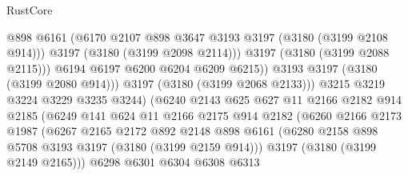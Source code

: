 \begin{lexlean}{RustCore}
\begin{coremodule}
                                      @898
                                      @6161
                                      (@6170
                                        @2107
                                        @898
                                        @3647
                                        @3193
                                        @3197
                                        (@3180 (@3199 @2108 @914)))
                                      @3197
                                      (@3180 (@3199 @2098 @2114)))
                                    @3197
                                    (@3180 (@3199 @2088 @2115)))
                                  @6194
                                  @6197
                                  @6200
                                  @6204
                                  @6209
                                  @6215))
                              @3193
                              @3197
                              (@3180 (@3199 @2080 @914)))
                            @3197
                            (@3180 (@3199 @2068 @2133)))
                          @3215
                          @3219
                          @3224
                          @3229
                          @3235
                          @3244)
                        (@6240
                          @2143
                          @625
                          @627
                          @11
                          @2166
                          @2182
                          @914
                          @2185
                          (@6249
                            @141
                            @624
                            @11
                            @2166
                            @2175
                            @914
                            @2182
                            (@6260
                              @2166
                              @2173
                              @1987
                              (@6267
                                @2165
                                @2172
                                @892
                                @2148
                                @898
                                @6161
                                (@6280 @2158 @898 @5708 @3193 @3197 (@3180 (@3199 @2159 @914)))
                                @3197
                                (@3180 (@3199 @2149 @2165)))
                              @6298
                              @6301
                              @6304
                              @6308
                              @6313

\end{coremodule}
\end{lexlean}
